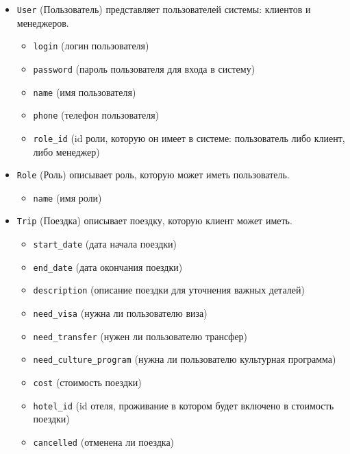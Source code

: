 \documentclass[a4paper,12pt]{article}
\begin{document}
\begin{itemize}
    \item \texttt{User} (Пользователь) представляет пользователей системы: клиентов и менеджеров.
          \begin{itemize}
              \item \texttt{login} (логин пользователя)
              \item \texttt{password} (пароль пользователя для входа в систему)
              \item \texttt{name} (имя пользователя)
              \item \texttt{phone} (телефон пользователя)
              \item \texttt{role\_id} (id роли, которую он имеет в системе: пользователь либо клиент, либо менеджер)
          \end{itemize}


    \item \texttt{Role} (Роль) описывает роль, которую может иметь пользователь.
          \begin{itemize}
              \item \texttt{name} (имя роли)
          \end{itemize}



    \item \texttt{Trip} (Поездка) описывает поездку, которую клиент может иметь.
          \begin{itemize}
              \item \texttt{start\_date} (дата начала поездки)
              \item \texttt{end\_date} (дата окончания поездки)
              \item \texttt{description} (описание поездки для уточнения важных деталей)
              \item \texttt{need\_visa} (нужна ли пользователю виза)
              \item \texttt{need\_transfer} (нужен ли пользователю трансфер)
              \item \texttt{need\_culture\_program} (нужна ли пользователю культурная программа)
              \item \texttt{cost} (стоимость поездки)
              \item \texttt{hotel\_id} (id отеля, проживание в котором будет включено в стоимость поездки)
              \item \texttt{cancelled} (отменена ли поездка)
          \end{itemize}




\end{itemize}
\end{document}
